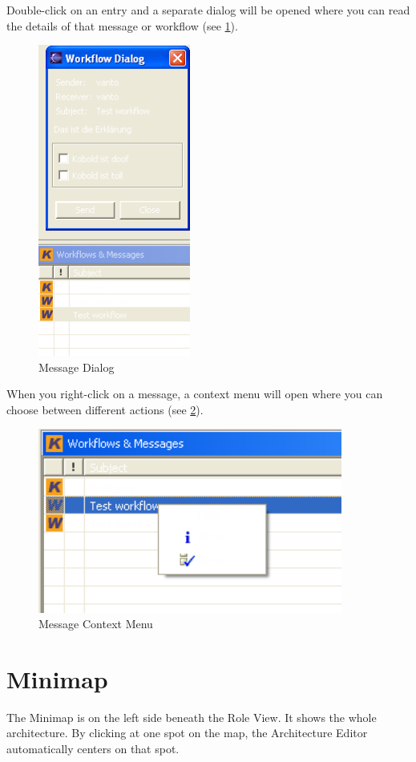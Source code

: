 Double-click on an entry and a 
separate dialog will be opened where you can read the details of that message or
workflow (see \ref{workflowdialog}).

\begin{figure}[h!]
\begin{center}
\includegraphics[width=5cm]{workflowdialog.png}
   \caption{Message Dialog}
\label{workflowdialog}
\end{center}
\end{figure}\par

When you right-click on a message, a context menu will open where you can choose 
between different actions (see \ref{workflowkontext}).

\begin{figure}[h!]
\begin{center}
\includegraphics[width=10cm]{workflowkontext.png}
   \caption{Message Context Menu}
\label{workflowkontext}
\end{center}
\end{figure}\par

\section{Minimap}

The Minimap is on the left side beneath the Role View. It shows the whole architecture.
By clicking at one spot on the map, the Architecture Editor automatically centers on that
spot. 
